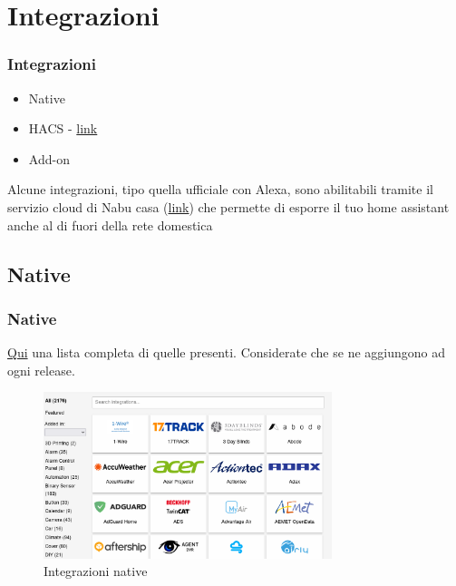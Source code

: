 \documentclass[hyperref={pdfpagelabels=false}]{beamer}
\begin{document}
	\section{Integrazioni}
	\begin{frame}
		\frametitle{Integrazioni}
		\begin{itemize}
			\item Native  
			\item HACS - \href{https://hacs.xyz}{link}
			\item Add-on
		\end{itemize}
		\begin{block}{Alcune integrazioni, tipo quella ufficiale con Alexa, sono abilitabili tramite il servizio cloud di Nabu casa (\href{https://www.nabucasa.com/}{link}) che permette di esporre il tuo home assistant anche al di fuori della rete domestica}
		\end{block}
	\end{frame}

	\subsection{Native}
	\begin{frame}
	\frametitle{Native}
		\href{https://www.home-assistant.io/integrations}{Qui}
		una lista completa di quelle presenti. Considerate che se ne aggiungono ad ogni release.
		\begin{figure}
			\centering
			\includegraphics[width=0.75\textwidth]{./images/core-integrations.png}
			\caption{Integrazioni native}
			\label{fig:core-integration}
		\end{figure}
	\end{frame}
\end{document}
